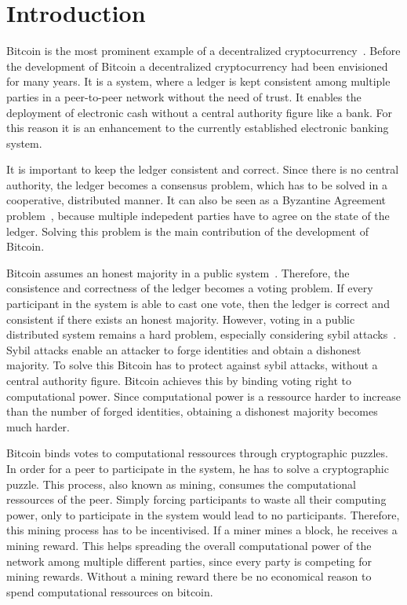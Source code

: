 \chapter{Introduction}\label{chap:introduction}
Bitcoin is the most prominent example of a decentralized cryptocurrency~\cite{1}. Before the development of Bitcoin a decentralized cryptocurrency had been envisioned for many years. It is a system, where a ledger is kept consistent among multiple parties in a peer-to-peer network without the need of trust. It enables the deployment of electronic cash without a central authority figure like a bank.
For this reason it is an enhancement to the currently established electronic banking system.

It is important to keep the ledger consistent and correct. Since there is no central authority, the ledger becomes a consensus problem, which has to be solved in a cooperative, distributed manner. It can also be seen as a Byzantine Agreement problem~\cite{garay2015bitcoin}, because multiple indepedent parties have to agree on the state of the ledger. Solving this problem is the main contribution of the development of Bitcoin.

Bitcoin assumes an honest majority in a public system~\cite{tschorsch}. Therefore, the consistence and correctness of the ledger becomes a voting problem. If every participant in the system is able to cast one vote, then the ledger is correct and consistent if there exists an honest majority. However, voting in a public distributed system remains a hard problem, especially considering sybil attacks~\cite{sybil}. Sybil attacks enable an attacker to forge identities and obtain a dishonest majority. To solve this Bitcoin has to protect against sybil attacks, without a central authority figure. Bitcoin achieves this by binding voting right to computational power. Since computational power is a ressource harder to increase than the number of forged identities, obtaining a dishonest majority becomes much harder.

Bitcoin binds votes to computational ressources through cryptographic puzzles. In order for a peer to participate in the system, he has to solve a cryptographic puzzle. This process, also known as mining, consumes the computational ressources of the peer. Simply forcing participants to waste all their computing power, only to participate in the system would lead to no participants. Therefore, this mining process has to be incentivised. If a miner mines a block, he receives a mining reward. This helps spreading the overall computational power of the network among multiple different parties, since every party is competing for mining rewards. Without a mining reward there be no economical reason to spend computational ressources on bitcoin.

